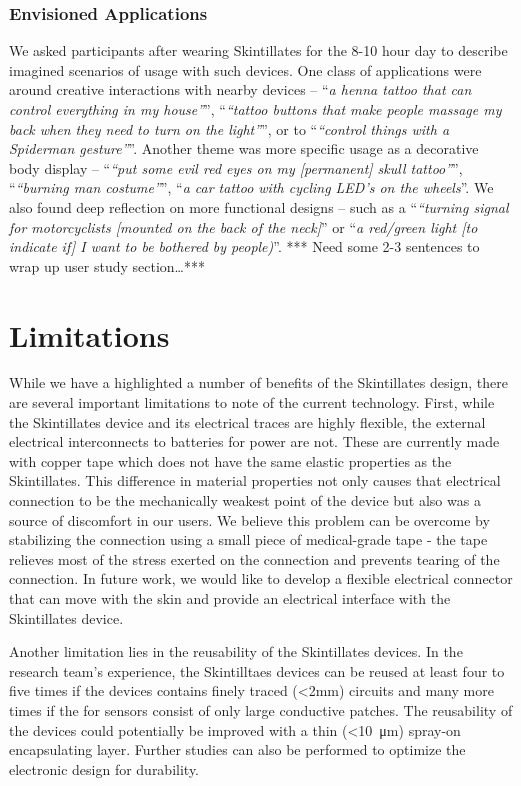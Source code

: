 \documentclass{sigchi}
\begin{document}
\subsubsection{Envisioned Applications}
We asked participants after wearing Skintillates for the 8-10 hour day to describe imagined scenarios of usage with such devices. One class of applications were around creative interactions with nearby devices – ``\textit{a henna tattoo that can control everything in my house”}'', ``\textit{“tattoo buttons that make people massage my back when they need to turn on the light”}'', or to ``\textit{“control things with a Spiderman gesture”}''.  Another theme was more specific usage as a decorative body display – ``\textit{“put some evil red eyes on my [permanent] skull tattoo”}'', ``\textit{“burning man costume”}'',  ``\textit{a car tattoo with cycling LED’s on the wheels}''. We also found deep reflection on more functional designs -- such as a ``\textit{“turning signal for motorcyclists [mounted on the back of the neck]}'' or ``\textit{a red/green light [to indicate if] I want to be bothered by people)}''.
*** Need some 2-3 sentences to wrap up user study section…***
\section {Limitations}
While we have a highlighted a number of benefits of the Skintillates design, there are several important limitations to note of the current technology. First, while the Skintillates device and its electrical traces are highly flexible, the external electrical interconnects to batteries for power are not.  These are currently made with copper tape which does not have the same elastic properties as the Skintillates. This difference in material properties not only causes that electrical connection to be the mechanically weakest point of the device but also was a source of discomfort in our users. We believe this problem can be overcome by stabilizing the connection using a small piece of medical-grade tape - the tape relieves most of the stress exerted on the connection and prevents tearing of the connection. In future work, we would like to develop a flexible electrical connector that can move with the skin and provide an electrical interface with the Skintillates device.

Another limitation lies in the reusability of the Skintillates devices. In the research team's experience, the Skintilltaes devices can be reused at least four to five times if the devices contains finely traced (\textless 2mm) circuits and many more times if the for sensors consist of only large conductive patches. The reusability of the devices could potentially be improved with a thin (\textless10\SI{}{\micro\metre})
 spray-on encapsulating layer. Further studies can also be performed to optimize the electronic design for durability. 
\end{document}
